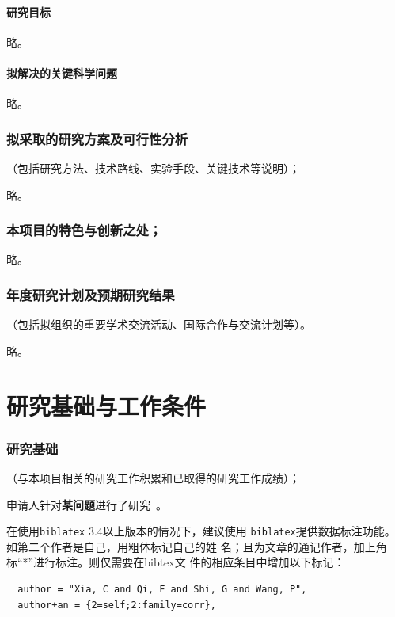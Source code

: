\subsection{研究目标}
\label{sec:goals}

略。

\subsection{拟解决的关键科学问题}

略。

\section{拟采取的研究方案及可行性分析}{（包括研究方法、技术路线、实验手段、关键技术等说明）；}
\label{sec:tech-feasibility}

略。

\section{本项目的特色与创新之处；}{}
\label{sec:innovations}

略。

\section{年度研究计划及预期研究结果}{（包括拟组织的重要学术交流活动、国际合作与交流计划等）。}
\label{sec:plans}

略。


\part{研究基础与工作条件}
\label{part:foundations}

\section{研究基础}{（与本项目相关的研究工作积累和已取得的研究工作成绩）；}
\label{sec:foundatioins}

\newrefsegment

  申请人针对\textbf{某问题}进行了研究~\cite{xia_saliency_2015}。

  在使用\texttt{biblatex} 3.4以上版本的情况下，建议使用
  \texttt{biblatex}提供数据标注功能。如第二个作者是自己，用粗体标记自己的姓
  名；且为文章的通记作者，加上角标``*''进行标注。则仅需要在bibtex文
  件的相应条目中增加以下标记：
\begin{verbatim}
  author = "Xia, C and Qi, F and Shi, G and Wang, P",
  author+an = {2=self;2:family=corr},
\end{verbatim}

